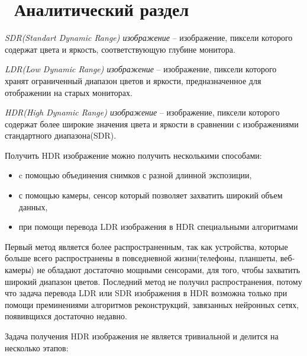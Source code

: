 \chapter{ Аналитический раздел}
\label{cha:analysis}

\textit{SDR(Standart Dynamic Range) изображение} -- изображение, пиксели которого содержат цвета и яркость, соответствующую глубине монитора.

\textit{LDR(Low Dynamic Range) изображение} -- изображение, пиксели которого хранят ограниченный диапазон цветов и яркости, предназначенное для отображении на старых мониторах.

\textit{HDR(High Dynamic Range) изображение} -- изображение, пиксели которого содержат более широкие значения цвета и яркости в сравнении с изображениями стандартного диапазона(SDR).

Получить HDR изображение можно получить несколькими способами: 
\begin{itemize}
    \item c помощью объединения снимков с разной длинной экспозиции,
    \item с помощью камеры, сенсор который позволяет захватить широкий объем данных,
    \item при помощи перевода LDR изображения в HDR специальными алгоритмами
\end{itemize}

Первый метод является более распространенным, так как устройства, которые больше всего распространены в повседневной жизни(телефоны, планшеты, веб-камеры) не обладают достаточно мощными сенсорами, для того, чтобы захватить широкий диапазон цветов. Последний метод не получил распространения, потому что задача перевода LDR или SDR изображения в HDR возможна только при помощи преминениями алгоритмов реконструкций, завязанных нейронных сетях, появивщихся достаточно недавно.

Задача получения HDR изображения не является тривиальной и делится на несколько этапов:

